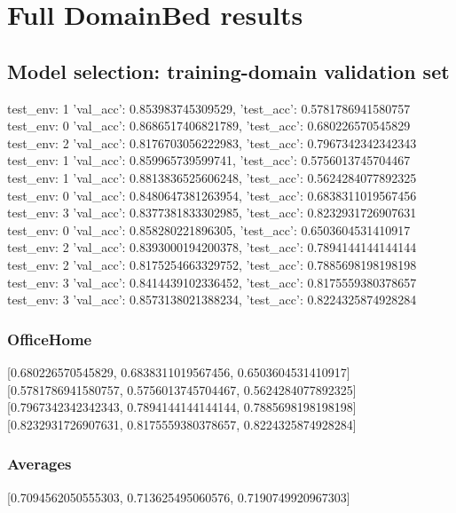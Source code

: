 \documentclass{article}
\begin{document}
\section{Full DomainBed results}

\subsection{Model selection: training-domain validation set}
test_env: 1
{'val_acc': 0.853983745309529, 'test_acc': 0.5781786941580757}
test_env: 0
{'val_acc': 0.8686517406821789, 'test_acc': 0.680226570545829}
test_env: 2
{'val_acc': 0.8176703056222983, 'test_acc': 0.7967342342342343}
test_env: 1
{'val_acc': 0.859965739599741, 'test_acc': 0.5756013745704467}
test_env: 1
{'val_acc': 0.8813836525606248, 'test_acc': 0.5624284077892325}
test_env: 0
{'val_acc': 0.8480647381263954, 'test_acc': 0.6838311019567456}
test_env: 3
{'val_acc': 0.8377381833302985, 'test_acc': 0.8232931726907631}
test_env: 0
{'val_acc': 0.858280221896305, 'test_acc': 0.6503604531410917}
test_env: 2
{'val_acc': 0.8393000194200378, 'test_acc': 0.7894144144144144}
test_env: 2
{'val_acc': 0.8175254663329752, 'test_acc': 0.7885698198198198}
test_env: 3
{'val_acc': 0.8414439102336452, 'test_acc': 0.8175559380378657}
test_env: 3
{'val_acc': 0.8573138021388234, 'test_acc': 0.8224325874928284}

\subsubsection{OfficeHome}
[0.680226570545829, 0.6838311019567456, 0.6503604531410917]
[0.5781786941580757, 0.5756013745704467, 0.5624284077892325]
[0.7967342342342343, 0.7894144144144144, 0.7885698198198198]
[0.8232931726907631, 0.8175559380378657, 0.8224325874928284]

\begin{center}
\end{center}

\subsubsection{Averages}
[0.7094562050555303, 0.713625495060576, 0.7190749920967303]

\begin{center}
\end{center}
\end{document}
